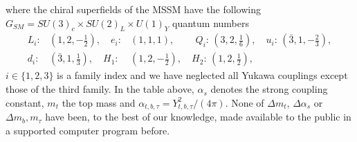 \documentclass[final,3p,times,pdflatex]{elsarticle}
\begin{document}
where the chiral superfields of the MSSM have the 
following $G_{SM}=SU(3)_c\times SU(2)_L\times U(1)_Y$ quantum numbers
\begin{eqnarray}
L_i:&(1,2,-\frac{1}{2}),\quad {e}_i:&(1,1,1),\qquad\, Q_i:\,(3,2,\frac{1}{6}),\quad
{u}_i:\,({\bar 3},1,-\frac{2}{3}),\nonumber\\ {d}_i:&({\bar
  3},1,\frac{1}{3}),\quad 
H_1:&(1,2,-\frac{1}{2}),\quad  H_2:\,(1,2,\frac{1}{2}),
\label{fields}
\end{eqnarray}
$i \in \{ 1,2,3\}$ is a family index and we have neglected all Yukawa
couplings except those of the third family.
In the table above, $\alpha_s$ denotes the strong coupling constant, $m_t$ the
top mass and
$\alpha_{t,b,\tau}=Y_{t,b,\tau}^2 / (4 \pi)$. 
None of $\Delta m_t$, $\Delta \alpha_s$ or $\Delta m_b, m_\tau$ have been, to
the best of our knowledge, made available to the public in a supported
computer program before. 
\end{document}
